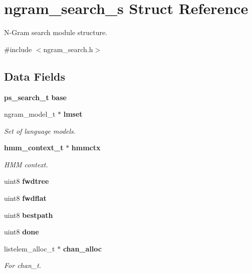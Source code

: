 \section{ngram\+\_\+search\+\_\+s Struct Reference}
\label{structngram__search__s}


N-\/\+Gram search module structure.  




{\ttfamily \#include $<$ngram\+\_\+search.\+h$>$}

\subsection*{Data Fields}
\begin{DoxyCompactItemize}
\item 
\mbox{\label{structngram__search__s_a572ad45de5b0f364096f0a8544fe5bf7}} 
\textbf{ ps\+\_\+search\+\_\+t} {\bfseries base}
\item 
ngram\+\_\+model\+\_\+t $\ast$ \textbf{ lmset}
\begin{DoxyCompactList}\small\item\em Set of language models. \end{DoxyCompactList}\item 
\textbf{ hmm\+\_\+context\+\_\+t} $\ast$ \textbf{ hmmctx}
\begin{DoxyCompactList}\small\item\em H\+MM context. \end{DoxyCompactList}\item 
\mbox{\label{structngram__search__s_aca37c8278a0dacb881cc6a2b0953c076}} 
uint8 {\bfseries fwdtree}
\item 
\mbox{\label{structngram__search__s_a88358958f4f983c96034cbbd4bc8f5cd}} 
uint8 {\bfseries fwdflat}
\item 
\mbox{\label{structngram__search__s_a0d1daeb151911b2243a1a91566be9063}} 
uint8 {\bfseries bestpath}
\item 
\mbox{\label{structngram__search__s_a3c51a66cf26de3aa050b3615d14ff060}} 
uint8 {\bfseries done}
\item 
\mbox{\label{structngram__search__s_abe9fe60f6e48b9a6e3d41856bb1dc109}} 
listelem\+\_\+alloc\+\_\+t $\ast$ \textbf{ chan\+\_\+alloc}
\begin{DoxyCompactList}\small\item\em For chan\+\_\+t. \end{DoxyCompactList}\item 
\mbox{\label{structngram__search__s_a576470858bfa44c671f0e677902ab424}} 

\end{DoxyCompactItemize}
